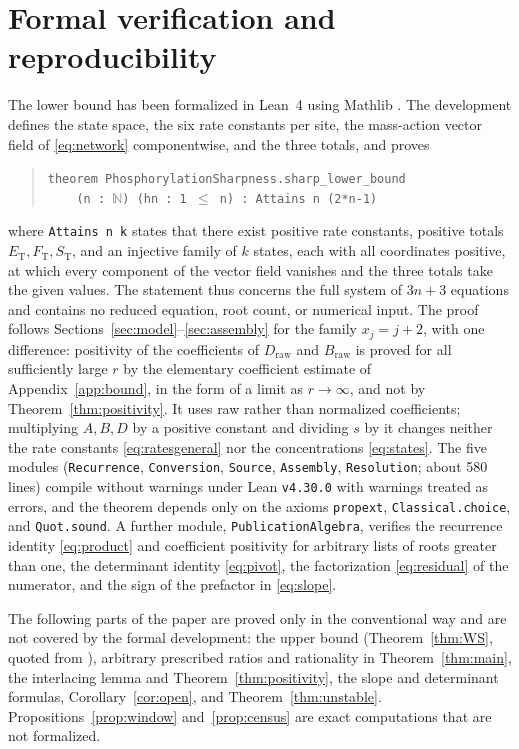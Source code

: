 \documentclass[11pt]{article}
\theoremstyle{plain}
\theoremstyle{definition}
\theoremstyle{remark}
\numberwithin{equation}{section}
\newcommand{\raw}{\mathrm{raw}}
\newcommand{\ET}{E_{\mathrm T}}
\newcommand{\FT}{F_{\mathrm T}}
\newcommand{\ST}{S_{\mathrm T}}
\begin{document}
\section{Formal verification and reproducibility}\label{sec:formal}
The lower bound has been formalized in Lean~4 \cite{Lean4} using Mathlib \cite{Mathlib}. The
development defines the state space, the six rate constants per site, the mass-action vector
field of \eqref{eq:network} componentwise, and the three totals, and proves
\begin{quote}
\texttt{theorem PhosphorylationSharpness.sharp\_lower\_bound}\\
\texttt{\ \ \ \ (n :\ $\mathbb N$) (hn :\ 1 $\le$ n) :\ Attains n (2*n-1)}
\end{quote}
where \texttt{Attains n k} states that there exist positive rate constants, positive totals
\(\ET,\FT,\ST\), and an injective family of \(k\) states, each with all coordinates positive,
at which every component of the vector field vanishes and the three totals take the given
values. The statement thus concerns the full system of \(3n+3\) equations and contains no
reduced equation, root count, or numerical input. The proof follows
Sections~\ref{sec:model}--\ref{sec:assembly} for the family \(x_j=j+2\), with one difference:
positivity of the coefficients of \(D_{\raw}\) and \(B_{\raw}\) is proved for all sufficiently
large \(r\) by the elementary coefficient estimate of Appendix~\ref{app:bound}, in the form of
a limit as \(r\to\infty\), and not by Theorem~\ref{thm:positivity}. It uses raw rather than
normalized coefficients; multiplying \(A,B,D\) by a positive constant and dividing \(s\) by it
changes neither the rate constants \eqref{eq:ratesgeneral} nor the concentrations
\eqref{eq:states}. The five modules (\texttt{Recurrence}, \texttt{Conversion},
\texttt{Source}, \texttt{Assembly}, \texttt{Resolution}; about 580 lines) compile without
warnings under Lean \texttt{v4.30.0} with warnings treated as errors, and the theorem depends
only on the axioms \texttt{propext}, \texttt{Classical.choice}, and \texttt{Quot.sound}. A
further module, \texttt{PublicationAlgebra}, verifies the recurrence identity
\eqref{eq:product} and coefficient positivity for arbitrary lists of roots greater than one,
the determinant identity \eqref{eq:pivot}, the factorization \eqref{eq:residual} of the
numerator, and the sign of the prefactor in \eqref{eq:slope}.

The following parts of the paper are proved only in the conventional way and are not covered
by the formal development: the upper bound (Theorem~\ref{thm:WS}, quoted from
\cite{WangSontag2008}), arbitrary prescribed ratios and rationality in
Theorem~\ref{thm:main}, the interlacing lemma and Theorem~\ref{thm:positivity}, the slope and
determinant formulas, Corollary~\ref{cor:open}, and Theorem~\ref{thm:unstable}.
Propositions~\ref{prop:window} and~\ref{prop:census} are exact computations that are not
formalized.
\end{document}
